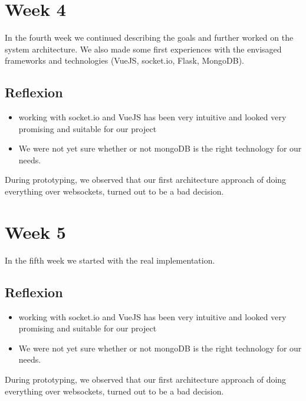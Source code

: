 \section{Week 4}
In the fourth week we continued describing the goals and further worked on the system architecture. We also made some first experiences with the envisaged frameworks and technologies (VueJS, socket.io, Flask, MongoDB).
\subsection{Reflexion}
\begin{itemize}
\item working with socket.io and VueJS has been very intuitive and looked very promising and suitable for our project
\item We were not yet sure whether or not mongoDB is the right technology for our needs.
\end{itemize}
During prototyping, we observed that our first architecture approach of doing everything over websockets, turned out to be a bad decision. 

\section{Week 5}
In the fifth week we started with the real implementation.
\subsection{Reflexion}
\begin{itemize}
\item working with socket.io and VueJS has been very intuitive and looked very promising and suitable for our project
\item We were not yet sure whether or not mongoDB is the right technology for our needs.
\end{itemize}
During prototyping, we observed that our first architecture approach of doing everything over websockets, turned out to be a bad decision. 

